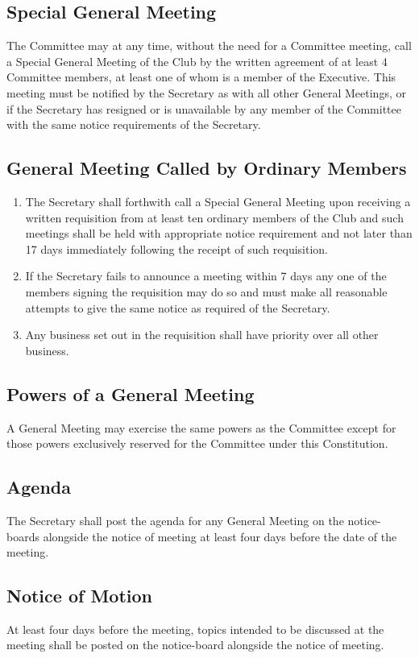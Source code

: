 \documentclass[11pt]{article} %
\begin{document}
\subsection{Special General Meeting}
The Committee may at any time, without the need for a Committee meeting, call a Special General Meeting of the Club by the written agreement of at least 4 Committee members, at least one of whom is a member of the Executive. This meeting must be notified by the Secretary as with all other General Meetings, or if the Secretary has resigned or is unavailable by any member of the Committee with the same notice requirements of the Secretary.

\subsection{General Meeting Called by Ordinary Members}
\begin{enumerate}
	\item The Secretary shall forthwith call a Special General Meeting upon receiving a written requisition from at least ten ordinary members of the Club and such meetings shall be held with appropriate notice requirement and not later than 17 days immediately following the receipt of such requisition.
	\item If the Secretary fails to announce a meeting within 7 days any one of the members signing the requisition may do so and must make all reasonable attempts to give the same notice as required of the Secretary.
	\item Any business set out in the requisition shall have priority over all other business.
\end{enumerate}

\subsection{Powers of a General Meeting}
A General Meeting may exercise the same powers as the Committee except for those powers exclusively reserved for the Committee under this Constitution.
\subsection{Agenda}
The Secretary shall post the agenda for any General Meeting on the notice-boards alongside the notice of meeting at least four days before the date of the meeting.

\subsection{Notice of Motion}
At least four days before the meeting, topics intended to be discussed at the meeting shall be posted on the notice-board alongside the notice of meeting.
\end{document}
